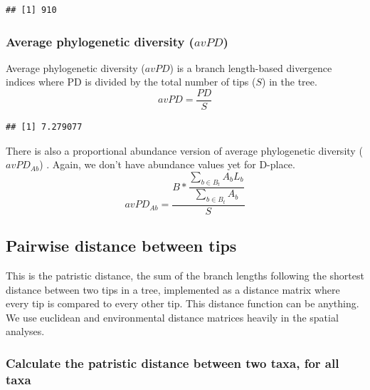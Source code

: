 \documentclass[]{book}
\newenvironment{Shaded}{\begin{snugshade}}{\end{snugshade}}
\newcommand{\KeywordTok}[1]{\textcolor[rgb]{0.13,0.29,0.53}{\textbf{{#1}}}}
\newcommand{\StringTok}[1]{\textcolor[rgb]{0.31,0.60,0.02}{{#1}}}
\newcommand{\OperatorTok}[1]{\textcolor[rgb]{0.81,0.36,0.00}{\textbf{{#1}}}}
\newcommand{\NormalTok}[1]{{#1}}
\theoremstyle{definition}
\theoremstyle{definition}
\theoremstyle{remark}
\begin{document}
\begin{verbatim}
## [1] 910
\end{verbatim}

\subsubsection{\texorpdfstring{Average phylogenetic diversity
(\(avPD\))}{Average phylogenetic diversity (avPD)}}\label{average-phylogenetic-diversity-avpd}

Average phylogenetic diversity (\(avPD\)) \citep{Clarke2001} is a branch
length-based divergence indices where PD is divided by the total number
of tips (\(S\)) in the tree. \[avPD = \dfrac{PD}{S}\]

\begin{Shaded}
\end{Shaded}

\begin{verbatim}
## [1] 7.279077
\end{verbatim}

There is also a proportional abundance version of average phylogenetic
diversity (\(avPD_{Ab}\)) \citep{Tucker2016}. Again, we don't have
abundance values yet for D-place.
\[avPD_{Ab} = \dfrac{B * \dfrac{\sum_{b \in B_{t}}^{}A_{b}L_{b}}{\sum_{b \in B_{t}}^{}A_{b}}}{S}\]

\hypertarget{pairwise-distance-between-tips}{\subsection{Pairwise
distance between tips}\label{pairwise-distance-between-tips}}

This is the patristic distance, the sum of the branch lengths following
the shortest distance between two tips in a tree, implemented as a
distance matrix where every tip is compared to every other tip. This
distance function can be anything. We use euclidean and environmental
distance matrices heavily in the spatial analyses.

\subsubsection{Calculate the patristic distance between two taxa, for
all
taxa}\label{calculate-the-patristic-distance-between-two-taxa-for-all-taxa}
\end{document}
